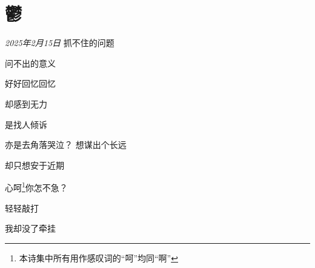 \section*{鬱}
\begin{center}
\textit{2025年2月15日}\hh 
抓不住的问题

问不出的意义

好好回忆回忆

却感到无力

是找人倾诉

亦是去角落哭泣？\hh 
想谋出个长远

却只想安于近期

心呵\footnote{本诗集中所有用作感叹词的“呵”均同“啊”}你怎不急？

轻轻敲打

我却没了牵挂
\end{center}